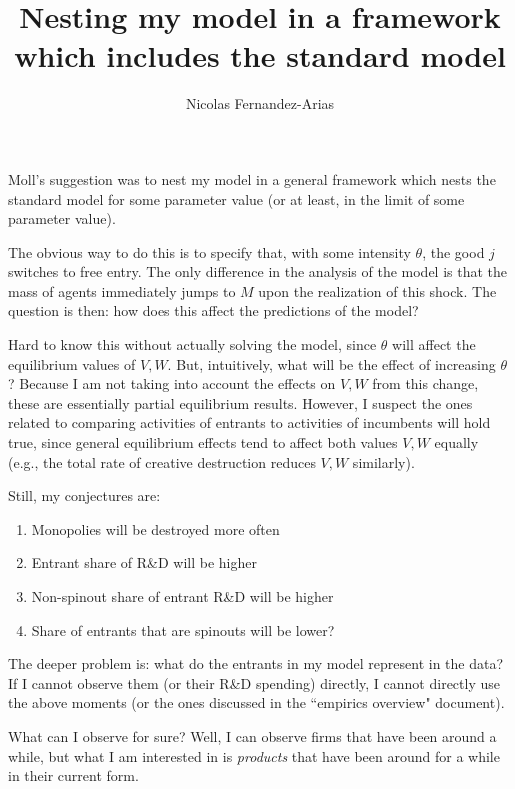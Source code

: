\documentclass[12pt,english]{article}
\theoremstyle{remark}
\begin{document}
\title{Nesting my model in a framework which includes the standard model}
\author{Nicolas Fernandez-Arias}
\maketitle

Moll's suggestion was to nest my model in a general framework which nests the standard model for some parameter value (or at least, in the limit of some parameter value).

The obvious way to do this is to specify that, with some intensity $\theta$, the good $j$ switches to free entry. The only difference in the analysis of the model is that the mass of agents immediately jumps to $M$ upon the realization of this shock. The question is then: how does this affect the predictions of the model?

Hard to know this without actually solving the model, since $\theta$ will affect the equilibrium values of $V,W$. But, intuitively, what will be the effect of increasing $\theta$? Because I am not taking into account the effects on $V,W$ from this change, these are essentially partial equilibrium results. However, I suspect the ones related to comparing activities of entrants to activities of incumbents will hold true, since general equilibrium effects tend to affect both values $V,W$ equally (e.g., the total rate of creative destruction reduces $V,W$ similarly). 

Still, my conjectures are:

\begin{enumerate}
	\item Monopolies will be destroyed more often
	\item Entrant share of R\&D will be higher
	\item Non-spinout share of entrant R\&D will be higher
	\item Share of entrants that are spinouts will be lower?
\end{enumerate}

The deeper problem is: what do the entrants in my model represent in the data? If I cannot observe them (or their R\&D spending) directly, I cannot directly use the above moments (or the ones discussed in the ``empirics overview" document). 

What can I observe for sure? Well, I can observe firms that have been around a while, but what I am interested in is \textit{products} that have been around for a while in their current form. 
\end{document}
